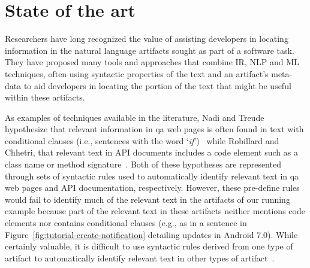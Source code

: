 \section{State of the art}
\label{cp1:novelty}


Researchers have long recognized the value of 
assisting developers in locating information in the natural language artifacts sought as part of a software task.
They have proposed many tools and approaches 
that combine \acf{IR}, \acf{NLP} and \acf{ML} techniques,
often using  syntactic properties of the text and an artifact's meta-data
to aid developers in locating the portion of the text that
might be useful within these artifacts.






As examples of techniques available in the literature, 
 Nadi and Treude hypothesize 
that relevant information in \acs{qa} 
web pages is often found in text with
conditional clauses (i.e., sentences with the word `\textit{if}')~\cite{nadi2020}
while Robillard and Chhetri, that relevant 
text in API documents includes a code element such as a class name or method signature~\cite{Robillard2015}.
Both of these hypotheses are 
represented through 
sets of syntactic rules 
used to automatically
identify relevant text in \acs{qa} web pages and API documentation, respectively.
However, these pre-define rules would fail to identify much of the relevant text in the artifacts of our running example
because part of the relevant text in these artifacts 
neither mentions code elements 
nor contains conditional clauses (e.g., as in a sentence in Figure~\ref{fig:tutorial-create-notification} detailing updates in Android 7.0).
While certainly valuable, 
it is difficult to use 
syntactic rules 
derived from one type of artifact
to automatically identify relevant text 
in other types of artifact~\cite{Bavota2016}.


% 



